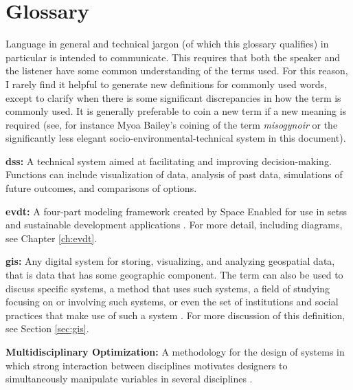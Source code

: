 \chapter{Glossary}

Language in general and technical jargon (of which this glossary qualifies) in particular is intended to communicate. This requires that both the speaker and the listener have some common understanding of the terms used. For this reason, I rarely find it helpful to generate new definitions for commonly used words, except to clarify when there is some significant discrepancies in how the term is commonly used. It is generally preferable to coin a new term if a new meaning is required (see, for instance Myoa Bailey's coining of the term \textit{misogynoir} \cite{baileyMoreOriginMisogynoir} or the significantly less elegant socio-environmental-technical system in this document).  


\textbf{\acf{dss}:} A technical system aimed at facilitating and improving decision-making. Functions can include visualization of data, analysis of past data, simulations of future outcomes, and comparisons of options.

\textbf{\acf{evdt}:} A four-part modeling framework created by Space Enabled for use in \acp{sets} and sustainable development applications \cite{reidCombiningSocialEnvironmental2019}. For more detail, including diagrams, see Chapter \ref{ch:evdt}.

\textbf{\acf{gis}:} Any digital system for storing, visualizing, and analyzing geospatial data, that is data that has some geographic component. The term can also be used to discuss specific systems, a method that uses such systems, a field of studying focusing on or involving such systems, or even the set of institutions and social practices that make use of such a system \cite{sheppardGISSocietyResearch1995}. For more discussion of this definition, see Section \ref{sec:gis}.

\textbf{Multidisciplinary Optimization:} A methodology for the design of systems in which strong interaction between disciplines motivates designers to simultaneously manipulate variables in several disciplines \cite{sobieszczanski-sobieskiMultidisciplinaryAerospaceDesign1997}.

